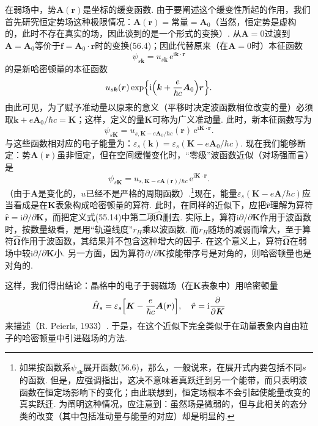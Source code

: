在弱场中，势$\bm A(\bm r)$是坐标的缓变函数. 由于要阐述这个缓变性所起的作用，我们首先研究恒定势场这种极限情况：$\bm A(\bm r)=$常量$=\bm A_0$（当然，恒定势是虚构的，此时不存在真实的场，因此谈到的是一个形式的变换）. 从$\bm A=0$过渡到$\bm A=\bm A_0$等价于$\bm f=\bm A_0\cdot\bm r$时的变换(56.4)；因此代替原来（在$\bm A=0$时）本征函数
\begin{equation}
\psi_{s\bm k}=u_{s\bm k}\,\mathrm e^{\mathrm i\bm k\cdot\bm r}
\label{56.5}
\end{equation}
的是新哈密顿量的本征函数
\begin{equation*}
u_{s\bm k}(\bm r)\exp\Bigl\{\mathrm i\Bigl(\bm k+\frac{e}{\hbar c}\bm A_0\Bigr)\bm r\Bigr\}.
\end{equation*}
由此可见，为了赋予准动量以原来的意义（平移时决定波函数相位改变的量）必须取$\bm k+e\bm A_0/\hbar c=\bm K$；这样，定义的量$\bm K$可称为广义准动量. 此时，新本征函数写为
\begin{equation*}
\psi_{s\bm K}=u_{s,\bm K-e\bm A_0/\hbar c}(\bm r)\,\mathrm e^{\mathrm i\bm K\cdot\bm r}.
\end{equation*}
与这些函数相对应的电子能量为：$\varepsilon_s(\bm k)=\varepsilon_s(\bm K-e\bm A_0/\hbar c)$. 现在我们能够断定：势$\bm A(\bm r)$虽非恒定，但在空间缓慢变化时，“零级”波函数近似（对场强而言）是
\begin{equation}
\psi_{s\bm K}=u_{s,\bm K-e\bm A(\bm r)/\hbar c}\,\mathrm e^{\mathrm i\bm K\cdot\bm r}.
\label{56.6}
\end{equation}
（由于$\bm A$是变化的，$u$已经不是严格的周期函数）.\footnote{如果按函数系$\psi_{s\bm k}$展开函数(56.6)，那么，一般说来，在展开式内要包括不同$s$的函数. 但是，应强调指出，这决不意味着真跃迁到另一个能带，而只表明波函数在恒定场影响下的变化；由此联想到，恒定场根本不会引起使能量改变的真实跃迁. 为阐明这种情况，应注意到：虽然场是微弱的，但与此相关的态分类的改变（其中包括准动量与能量的对应）却是明显的.}现在，能量$\varepsilon_s(\bm K-e\bm A/\hbar c)$应当看成是在$\bm K$表象构成哈密顿量的算符. 此时，在同样的近似下，应把$\hat{\bm r}$理解为算符$\hat{\bm r}=\mathrm i\partial/\partial\bm K$，而把定义式(55.14)中第二项$\hat{\bm\Omega}$删去. 实际上，算符$\mathrm i\partial/\partial\bm K$作用于波函数时，按数量级看，是用“轨道线度”$r_H$乘以波函数. 而$r_H$随场的减弱而增大，至于算符$\hat{\bm\Omega}$作用于波函数，其结果并不包含这种增大的因子. 在这个意义上，算符$\hat{\bm\Omega}$在弱场中较$\mathrm i\partial/\partial\bm K$小. 另一方面，因为算符$\partial/\partial\bm K$按能带序号是对角的，则哈密顿量也是对角的.

这样，我们得出结论：晶格中的电子于弱磁场（在$\bm K$表象中）用哈密顿量
\begin{equation}
\hat H_s=\varepsilon_s\Bigl[\bm K-\frac{e}{\hbar c}\bm A(\bm r)\Bigr],\quad
\hat{\bm r}=\mathrm i\frac{\partial}{\partial\bm K}
\label{56.7}
\end{equation}
来描述（R. Peierls, 1933）. 于是，在这个近似下完全类似于在动量表象内自由粒子的哈密顿量中引进磁场的方法.

